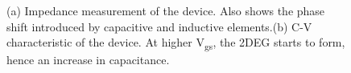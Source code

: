 \documentclass[11pt,a4paper]{report}
\begin{document}
\begin{figure}
    \begin{minipage}{.5\linewidth}
    \centering
    \end{minipage}
    \begin{minipage}{.5\linewidth}
    \centering
    \end{minipage}\par\medskip
    \caption{(a) Impedance measurement of the device. Also shows the phase shift introduced by capacitive and inductive elements.(b) C-V characteristic of the device. At higher V\textsubscript{gs}, the 2DEG starts to form, hence an increase in capacitance.}
    \label{fig:CV_Impedance_figure}
\end{figure}
\end{document}
